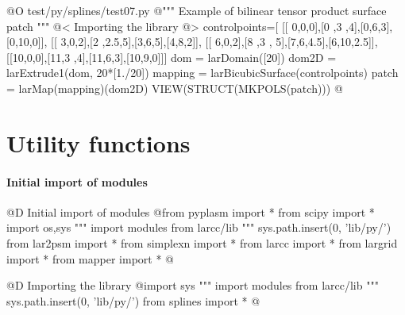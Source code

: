 \documentclass[11pt,oneside]{article}	%
\begin{document}
@O test/py/splines/test07.py
@{""" Example of bilinear tensor product surface patch """
@< Importing the library @>
controlpoints=[
	[[ 0,0,0],[0 ,3  ,4],[0,6,3],[0,10,0]],
	[[ 3,0,2],[2 ,2.5,5],[3,6,5],[4,8,2]],
	[[ 6,0,2],[8 ,3 , 5],[7,6,4.5],[6,10,2.5]],
	[[10,0,0],[11,3  ,4],[11,6,3],[10,9,0]]]
dom = larDomain([20])
dom2D = larExtrude1(dom, 20*[1./20])
mapping = larBicubicSurface(controlpoints)
patch = larMap(mapping)(dom2D)
VIEW(STRUCT(MKPOLS(patch)))
@}



\appendix
\section{Utility functions}

\paragraph{Initial import of modules}

@D Initial import of modules
@{from pyplasm import *
from scipy import *
import os,sys
""" import modules from larcc/lib """
sys.path.insert(0, 'lib/py/')
from lar2psm import *
from simplexn import *
from larcc import *
from largrid import *
from mapper import *
@}


@D Importing the library
@{import sys
""" import modules from larcc/lib """
sys.path.insert(0, 'lib/py/') 
from splines import *
@}




\end{document}
